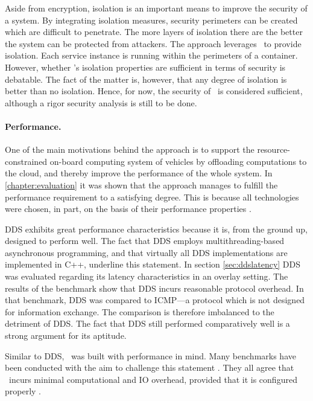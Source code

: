 Aside from encryption, isolation is an important means to improve the security of a system. By integrating isolation measures, security perimeters can be created which are difficult to penetrate. The more layers of isolation there are the better the system can be protected from attackers. The approach leverages \docker\ to provide isolation. Each service instance is running within the perimeters of a container. However, whether \docker 's isolation properties are sufficient in terms of security is debatable. The fact of the matter is, however, that any degree of isolation is better than no isolation. Hence, for now, the security of \docker\ is considered sufficient, although a rigor security analysis is still to be done.
\paragraph{Performance.}
One of the main motivations behind the approach is to support the resource-constrained on-board computing system of vehicles by offloading computations to the cloud, and thereby improve the performance of the whole system. In \autoref{chapter:evaluation} it was shown that the approach manages to fulfill the performance requirement to a satisfying degree. This is because all technologies were chosen, in part, on the basis of their performance properties .

DDS exhibits great performance characteristics because it is, from the ground up, designed to perform well. The fact that DDS employs multithreading-based asynchronous programming, and that virtually all DDS implementations are implemented in C++, underline this statement. In section \ref{sec:ddslatency} DDS was evaluated regarding its latency characteristics in an overlay setting. The results of the benchmark show that DDS incurs reasonable protocol overhead. In that benchmark, DDS was compared to ICMP---a protocol which is not designed for information exchange. The comparison is therefore imbalanced to the detriment of DDS. The fact that DDS still performed comparatively well is a strong argument for its aptitude. 

Similar to DDS, \docker\ was built with performance in mind. Many benchmarks have been conducted with the aim to challenge this statement \cite{felter2015updated,morabito2015hypervisors}. They all agree that \docker\ incurs minimal computational and IO overhead, provided that it is configured properly .

